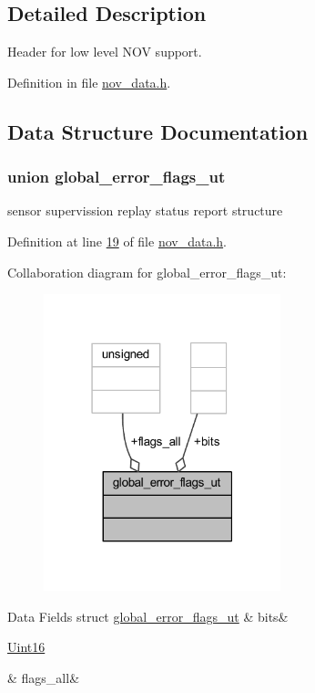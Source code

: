 \subsection{Detailed Description}
Header for low level N\+O\+V support. 



Definition in file \hyperlink{a00022_source}{nov\+\_\+data.\+h}.



\subsection{Data Structure Documentation}
\label{d1/d0b/a00452}
\hypertarget{a00022_d1/d0b/a00452}{}
\subsubsection{union global\+\_\+error\+\_\+flags\+\_\+ut}
sensor supervission replay status report structure 

Definition at line \hyperlink{a00022_source_l00019}{19} of file \hyperlink{a00022_source}{nov\+\_\+data.\+h}.



Collaboration diagram for global\+\_\+error\+\_\+flags\+\_\+ut\+:\nopagebreak
\begin{figure}[H]
\begin{center}
\leavevmode
\includegraphics[width=195pt]{df/dce/a00974}
\end{center}
\end{figure}
\begin{DoxyFields}{Data Fields}
\hypertarget{a00022_af3b6909b65aeec5ddf2b0217ee242bd3}{struct \hyperlink{a00022_da/dc3/a00453}{global\+\_\+error\+\_\+flags\+\_\+ut}}\label{a00022_af3b6909b65aeec5ddf2b0217ee242bd3}
&
bits&
\\
\hline

\hypertarget{a00022_a82602ac07808604d0870a9880b62d5f4}{\hyperlink{a00072_a59a9f6be4562c327cbfb4f7e8e18f08b}{Uint16}}\label{a00022_a82602ac07808604d0870a9880b62d5f4}
&
flags\+\_\+all&
\\
\hline

\end{DoxyFields}
\label{d2/d5a/a00792}
\hypertarget{a00022_d2/d5a/a00792}{}
